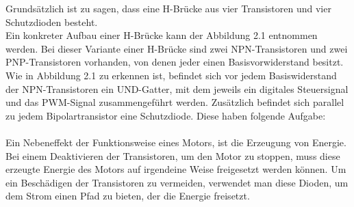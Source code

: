 Grundsätzlich ist zu sagen, dass eine H-Brücke aus vier Transistoren und vier Schutzdioden besteht. \\
Ein konkreter Aufbau einer H-Brücke kann der Abbildung 2.1 entnommen werden.
Bei dieser Variante einer H-Brücke sind zwei NPN-Transistoren und zwei PNP-Transistoren vorhanden, von denen jeder einen Basisvorwiderstand besitzt.
Wie in Abbildung 2.1 zu erkennen ist, befindet sich vor jedem Basiswiderstand der NPN-Transistoren ein UND-Gatter, mit dem jeweils ein digitales Steuersignal und das PWM-Signal zusammengeführt werden.
Zusätzlich befindet sich parallel zu jedem Bipolartransistor eine Schutzdiode.
Diese haben folgende Aufgabe:\\\\
Ein Nebeneffekt der Funktionsweise eines Motors, ist die Erzeugung von Energie.
Bei einem Deaktivieren der Transistoren, um den Motor zu stoppen, muss diese erzeugte Energie des Motors auf irgendeine Weise freigesetzt werden können.
Um ein Beschädigen der Transistoren zu vermeiden, verwendet man diese Dioden, um dem Strom einen Pfad zu bieten, der die Energie freisetzt. \\\\


